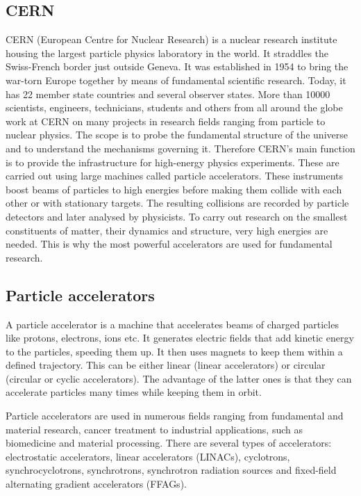 \documentclass[12pt]{packages/mytustyle}  %
\begin{document}
\subsection{CERN}
CERN (European Centre for Nuclear Research) is a nuclear research institute housing the largest particle physics laboratory in the world. It straddles the Swiss-French border just outside Geneva. It was established in 1954 to bring the war-torn Europe together by means of fundamental scientific research. Today, it has 22 member state countries and several observer states. More than 10000 scientists, engineers, technicians, students and others from all around the globe work at CERN on many projects in research fields ranging from particle to nuclear physics. The scope is to probe the fundamental structure of the universe and to understand the mechanisms governing it. Therefore CERN's main function is to provide the infrastructure for high-energy physics experiments. These are carried out using large machines called particle accelerators. These instruments boost beams of particles to high energies before making them collide with each other or with stationary targets. The resulting collisions are recorded by particle detectors and later analysed by physicists. To carry out research on the smallest constituents of matter, their dynamics and structure, very high energies are needed. This is why the most powerful accelerators are used for fundamental research. 

\subsection{Particle accelerators}
A particle accelerator is a machine that accelerates beams of charged particles like protons, electrons, ions etc. It generates electric fields that add kinetic energy to the particles, speeding them up. It then uses magnets to keep them within a defined trajectory. This can be either linear (linear accelerators) or circular (circular or cyclic accelerators). The advantage of the latter ones is that they can accelerate particles many times while keeping them in orbit.

Particle accelerators are used in numerous fields ranging from fundamental and material research, cancer treatment to industrial applications, such as biomedicine and material processing. There are several types of accelerators: electrostatic accelerators, linear accelerators (LINACs), cyclotrons, synchrocyclotrons, synchrotrons, synchrotron radiation sources and fixed-field alternating gradient accelerators (FFAGs).
\end{document}
